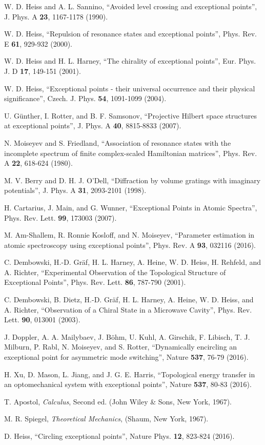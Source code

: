 \documentclass{article}
\begin{document}
\begin{thebibliography}{99}
  W. D. Heiss and A. L. Sannino, ``Avoided level crossing and
exceptional points'', J. Phys. A \textbf{23}, 1167-1178 (1990).

  W. D. Heiss, ``Repulsion of resonance states and exceptional
points'', Phys. Rev. E \textbf{61}, 929-932 (2000).

  W. D. Heiss and H. L. Harney, ``The chirality of exceptional
points'', Eur. Phys. J. D \textbf{17}, 149-151 (2001).

  W. D. Heiss, ``Exceptional points - their universal
occurrence and their physical significance'', Czech. J. Phys. \textbf{54},
1091-1099 (2004).

  U. G\"{u}nther, I. Rotter, and B. F. Samsonov, ``Projective
Hilbert space structures at exceptional points'', J. Phys. A \textbf{40},
8815-8833 (2007).

  N. Moiseyev and S. Friedland, ``Association of resonance
states with the incomplete spectrum of finite complex-scaled Hamiltonian
matrices'', Phys. Rev. A \textbf{22}, 618-624 (1980).

  M. V. Berry and D. H. J. O'Dell, ``Diffraction by volume
gratings with imaginary potentials'', J. Phys. A \textbf{31}, 2093-2101
(1998).

  H. Cartarius, J. Main, and G. Wunner, ``Exceptional Points
in Atomic Spectra'', Phys. Rev. Lett. \textbf{99}, 173003 (2007).

  M. Am-Shallem, R. Ronnie Kosloff, and N. Moiseyev,
``Parameter estimation in atomic spectroscopy using exceptional
points'', Phys. Rev. A \textbf{93}, 032116 (2016).

  C. Dembowski, H.-D. Gr\"{a}f, H. L. Harney, A. Heine,
W. D. Heiss, H. Rehfeld, and A. Richter, ``Experimental
Observation of the Topological Structure of Exceptional Points'',
Phys. Rev. Lett. \textbf{86}, 787-790 (2001).

  C. Dembowski, B. Dietz, H.-D. Gr\"{a}f, H. L. Harney,
A. Heine, W. D. Heiss, and A. Richter, ``Observation of a Chiral
State in a Microwave Cavity'', Phys. Rev. Lett. \textbf{90},
013001 (2003).

  J. Doppler, A. A. Mailybaev, J. B\"{o}hm, U. Kuhl,
A. Girschik, F. Libisch, T. J. Milburn, P. Rabl, N. Moiseyev, and
S. Rotter, ``Dynamically encircling an exceptional point for
asymmetric mode switching'', Nature \textbf{537}, 76-79 (2016).

  H. Xu, D. Mason, L. Jiang, and J. G. E. Harris,
``Topological energy transfer in an optomechanical system with
exceptional points'', Nature \textbf{537}, 80-83 (2016).

  T. Apostol, \textsl{Calculus}, Second ed. (John Wiley \&
Sons, New York, 1967).

  M. R. Spiegel, \textsl{Theoretical Mechanics}, (Shaum, New
York, 1967).

  D. Heiss, ``Circling exceptional points'', Nature Phys.
\textbf{12}, 823-824 (2016).
\end{thebibliography}
\end{document}
